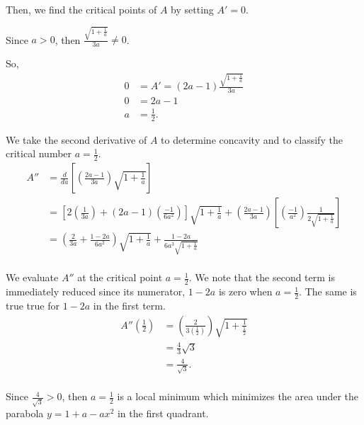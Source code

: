 \documentclass[../hw6.tex]{subfiles}
\begin{document}
Then, we find the critical points of $A$ by setting $A'=0$.

Since $a>0$, then $\frac{\sqrt{1+\frac{1}{a}}}{3a}\neq0$.

So,
\begin{align*}
    0 &= A' = (2a-1) \frac{\sqrt{1+\frac{1}{a}}}{3a} \\
    0 &=2a-1 \\
    a&=\frac{1}{2}.
\end{align*}

We take the second derivative of $A$ to determine concavity and to classify the critical number $a=\frac{1}{2}$.
\begin{align*}
    A'' &= \frac{d}{da} \left[ \left( \frac{2a-1}{3a} \right) \sqrt{1+\frac{1}{a}} \right] \\
    &= \left[ 2 \left( \frac{1}{3a} \right) + (2a-1) \left( \frac{-1}{6a^2} \right) \right] \sqrt{1+\frac{1}{a}} + \left( \frac{2a-1}{3a} \right) \left[ \left( \frac{-1}{a^2} \right) \frac{1}{2\sqrt{1+\frac{1}{a}}}\right] \\
    &= \left( \frac{2}{3a} + \frac{1-2a}{6a^2} \right) \sqrt{1+\frac{1}{a}} + \frac{1-2a}{6a^3\sqrt{1+\frac{1}{a}}} \\
\end{align*}

We evaluate $A''$ at the critical point $a=\frac{1}{2}$. We note that the second term is immediately reduced since its numerator, $1-2a$ is zero when $a=\frac{1}{2}$. The same is true true for $1-2a$ in the first term.
\begin{align*}
    A''\left( \frac{1}{2} \right) &= \left( \frac{2}{3\left( \frac{1}{2} \right)} \right) \sqrt{1+\frac{1}{\frac{1}{2}}} \\
    &= \frac{4}{3} \sqrt{3} \\
    &= \frac{4}{\sqrt{3}}. \\
\end{align*}

Since $\frac{4}{\sqrt{3}}>0$, then $a=\frac{1}{2}$ is a local minimum which minimizes the area under the parabola $y=1+a-ax^2$ in the first quadrant.
\end{document}
